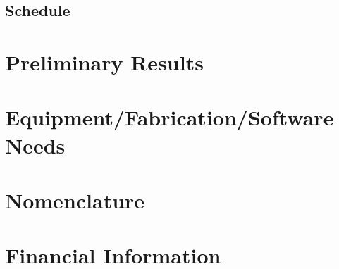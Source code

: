 \documentclass[12pt,titlepage]{article}
\begin{document}
\subsection{Schedule}

\section{Preliminary Results}

\addtocounter{section}{1} %

\section{Equipment/Fabrication/Software Needs}

\addtocounter{section}{1} %

\section{Nomenclature}

\makereferences

\makebibliography

\section{Financial Information}


\appendix

\end{document}
